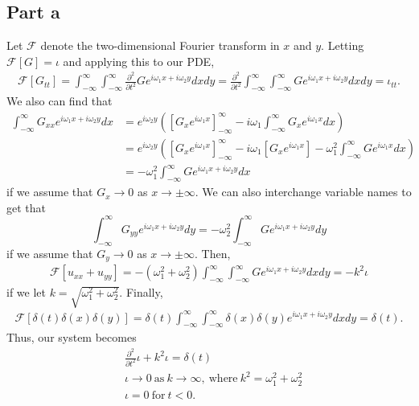 \documentclass{article}
\begin{document}
\subsection{Part a}
Let $\mathcal{F}$ denote the two-dimensional Fourier transform in $x$ and $y$. Letting $\mathcal{F}[G]=\iota$ and applying this to our PDE, 
\begin{align*}
\mathcal{F}[G_{tt}]=\int_{-\infty}^{\infty}\int_{-\infty}^{\infty}\frac{\partial^2}{\partial t^2}Ge^{i\omega_1x+i\omega_2y}dxdy=\frac{\partial^2}{\partial t^2}\int_{-\infty}^{\infty}\int_{-\infty}^{\infty}Ge^{i\omega_1x+i\omega_2y}dxdy=\iota_{tt}.
\end{align*}
We also can find that 
\begin{align*}
\int_{-\infty}^{\infty}G_{xx}e^{i\omega_1x+i\omega_2y}dx&=e^{i\omega_2y}\left(\left[G_xe^{i\omega_1x}\right]_{-\infty}^\infty-i\omega_1\int_{-\infty}^{\infty}G_xe^{i\omega_1x}dx\right)\\&=
e^{i\omega_2y}\left(\left[G_xe^{i\omega_1x}\right]_{-\infty}^\infty-i\omega_1\left[G_xe^{i\omega_1x}\right]-\omega_1^2\int_{-\infty}^{\infty}Ge^{i\omega_1x}dx\right)\\&=
-\omega_1^2\int_{-\infty}^{\infty}Ge^{i\omega_1x+i\omega_2y}dx
\end{align*}
if we assume that $G_x\to0$ as $x\to\pm\infty$. We can also interchange variable names to get that
\[
\int_{-\infty}^{\infty}G_{yy}e^{i\omega_1x+i\omega_2y}dy=-\omega_2^2\int_{-\infty}^{\infty}Ge^{i\omega_1x+i\omega_2y}dy
\]
if we assume that $G_y\to0$ as $x\to\pm\infty$. Then,
\begin{align*}
\mathcal{F}[u_{xx}+u_{yy}]=-(\omega_1^2+\omega_2^2)\int_{-\infty}^{\infty}\int_{-\infty}^{\infty}Ge^{i\omega_1x+i\omega_2y}dxdy=-k^2\iota
\end{align*}
if we let $k=\sqrt{\omega_1^2+\omega_2^2}$. Finally, 
\begin{align*}
\mathcal{F}[\delta(t)\delta(x)\delta(y)]=\delta(t)\int_{-\infty}^{\infty}\int_{-\infty}^{\infty}\delta(x)\delta(y)e^{i\omega_1x+i\omega_2y}dxdy=\delta(t).
\end{align*}
Thus, our system becomes
\begin{equation*}
	\begin{split}
		&\frac{\partial^2}{\partial t^2}\iota +k^2\iota = \delta(t)\\
		&\iota \to 0 \ \text{as} \ k \to \infty, \ \text{where} \ k^2 = \omega_1^2+\omega_2^2\\
		&\iota = 0 \ \text{for}\  t<0.\\
	\end{split}
\end{equation*}
\end{document}
